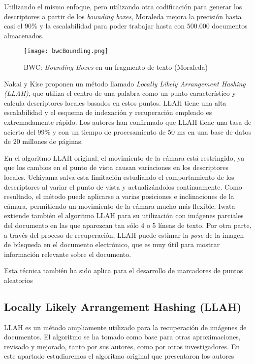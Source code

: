 Utilizando el mismo enfoque, pero utilizando otra codificación para generar los descriptores a partir de los \emph{bounding boxes}, Moraleda \cite{Moraleda} mejora la precisión hasta casi el 90\% y la escalabilidad para poder trabajar hasta con 500.000 documentos almacenados. 

\begin{figure}
  \centering
  \texttt{[image: bwcBounding.png]}
  \caption{BWC: \emph{Bounding Boxes} en un fragmento de texto  (Moraleda)}
  \label{fig:extraccionAd2}
\end{figure}

Nakai y Kise proponen un método llamado \emph{Locally Likely Arrangement Hashing (LLAH)}, que utiliza el centro de una palabra como un punto característico y calcula descriptores locales basados en estos puntos\cite{Nakai}. LLAH tiene una alta escalabilidad y el esquema de indexación y recuperación empleado es extremadamente rápido. Los autores han confirmado que LLAH tiene una tasa de acierto del 99\% y con un tiempo de procesamiento de 50 ms en una base de datos de 20 millones de páginas.

En el algoritmo LLAH original, el movimiento de la cámara está restringido, ya que los cambios en el punto de vista causan variaciones en los descriptores locales. Uchiyama \cite{Uchiyama2} salva esta limitación estudiando el comportamiento de los descriptores al variar el punto de vista y actualizándolos continuamente. Como resultado, el método puede aplicarse a varias posiciones e inclinaciones de la cámara, permitiendo un movimiento de la cámara mucho más flexible. Iwata \cite{Iwata} extiende también el algoritmo LLAH para su utilización con imágenes parciales del documento en las que aparezcan tan sólo 4 o 5 líneas de texto. Por otra parte, a través del proceso de recuperación, LLAH puede estimar la \emph{pose} de la imagen de búsqueda en el documento electrónico, que es muy útil para mostrar información relevante sobre el documento.

Esta técnica también ha sido aplica para el desarrollo de marcadores de puntos aleatorios \cite{Saito}

\subsection{Locally Likely Arrangement Hashing (LLAH)}

LLAH es un método ampliamente utilizado para la recuperación de imágenes de documentos. El algoritmo se ha tomado como base para otras aproximaciones, revisado y mejorado, tanto por sus autores, como por otros investigadores. En este apartado estudiaremos el algoritmo original que presentaron los autores \cite{Nakai0}

